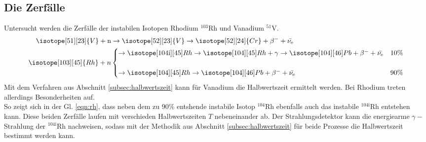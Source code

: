 \subsection{Die Zerfälle}
Untersucht werden die Zerfälle der instabilen Isotopen Rhodium $^{103}$Rh und Vanadium $^{51}$V.
\begin{align}
    \isotope[51][23]{V} + \text{n} &\to \isotope[52][23]{V} \to \isotope[52][24]{Cr} + \beta^- + \bar{\nu_{\text{e}}}\\
    \isotope[103][45]{Rh}+n&
    \begin{cases}
        \to \isotope[104\text{i}][45]Rh \to \isotope[104][45]Rh+\gamma \to \isotope[104][46]Pb+\beta^- + \bar{\nu_{\text{e}}} & 10\%\\\\
        \to \isotope[104][45]Rh \to \isotope[104][46]Pb+\beta^- + \bar{\nu_{\text{e}}} & 90\%
    \end{cases}
    \label{eqn:rh}
\end{align}
Mit dem Verfahren aus Abschnitt \ref{subsec:halbwertszeit} kann für Vanadium die Halbwertszeit ermittelt werden.
Bei Rhodium treten allerdings Besonderheiten auf.\\
So zeigt sich in der Gl. \ref{eqn:rh}, dass neben dem zu 90\% entshende instabile Isotop $^{104}$Rh ebenfalls
auch das instabile $^{104\text{i}}$Rh entstehen kann. Diese beiden Zerfälle laufen mit verschieden Halbwertszeiten $T$ 
nebeneinander ab. Der Strahlungsdetektor kann die energiearme $\gamma-$Strahlung der $^{104\text{i}}$Rh nachweisen,
sodass mit der Methodik aus Abschnitt \ref{subsec:halbwertszeit} für beide Prozesse 
die Halbwertszeit bestimmt werden kann.
